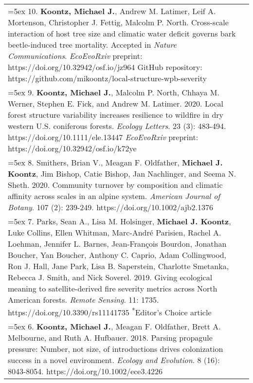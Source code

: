 \begin{longtable}{@{} >{\raggedright}p{5.25in} >{\raggedleft}X @{}}
\hangindent=5ex 10. \textbf{Koontz, Michael J.}, Andrew M. Latimer, Leif A. Mortenson, Christopher J. Fettig, Malcolm P. North. Cross-scale interaction of host tree size and climatic water deficit governs bark beetle-induced tree mortality. Accepted in \emph{Nature Communications}.
\newline \emph{EcoEvoRxiv} preprint: https://doi.org/10.32942/osf.io/jz964
\newline GitHub repository: https://github.com/mikoontz/local-structure-wpb-severity & 2020 \tabularnewline

\hangindent=5ex 9. \textbf{Koontz, Michael J.}, Malcolm P. North, Chhaya M. Werner, Stephen E. Fick, and Andrew M. Latimer. 2020. Local forest structure variability increases resilience to wildfire in dry western U.S. coniferous forests. \emph{Ecology Letters}. 23 (3): 483-494. https://doi.org/10.1111/ele.13447 \newline \emph{EcoEvoRxiv} preprint: https://doi.org/10.32942/osf.io/k72ye & 2020 \tabularnewline

\hangindent=5ex 8. Smithers, Brian V., Meagan F. Oldfather, \textbf{Michael J. Koontz}, Jim Bishop, Catie Bishop, Jan Nachlinger, and Seema N. Sheth. 2020. Community turnover by composition and climatic affinity across scales in an alpine system. \emph{American Journal of Botany}. 107 (2): 239-249. https://doi.org/10.1002/ajb2.1376 & 2020 \tabularnewline

\hangindent=5ex 7. Parks, Sean A., Lisa M. Holsinger, \textbf{Michael J. Koontz}, Luke Collins, Ellen Whitman, Marc-Andr\'e Parisien, Rachel A. Loehman, Jennifer L. Barnes, Jean-Fran\c{c}ois Bourdon, Jonathan Boucher, Yan Boucher, Anthony C. Caprio, Adam Collingwood, Ron J. Hall, Jane Park, Lisa B. Saperstein, Charlotte Smetanka, Rebecca J. Smith, and Nick Soverel. 2019. Giving ecological meaning to satellite-derived fire severity metrics across North American forests. \emph{Remote Sensing}. 11: 1735. https://doi.org/10.3390/rs11141735 \newline \textsuperscript{*}Editor's Choice article & 2019 \tabularnewline

\hangindent=5ex 6. \textbf{Koontz, Michael J.}, Meagan F. Oldfather, Brett A. Melbourne, and Ruth A. Hufbauer. 2018. Parsing propagule pressure: Number, not size, of introductions drives colonization success in a novel environment. \emph{Ecology and Evolution}. 8 (16): 8043-8054. https://doi.org/10.1002/ece3.4226 & 2018 \tabularnewline


\end{longtable}
